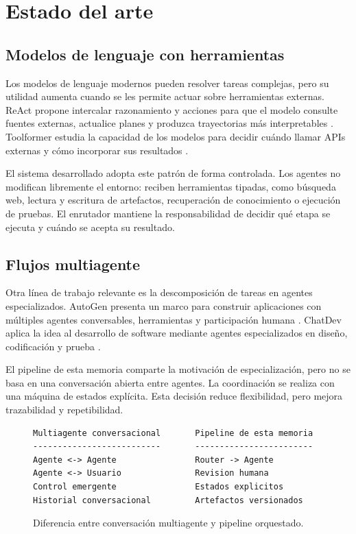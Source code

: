\chapter{Estado del arte}

\section{Modelos de lenguaje con herramientas}

Los modelos de lenguaje modernos pueden resolver tareas complejas, pero su
utilidad aumenta cuando se les permite actuar sobre herramientas externas.
ReAct propone intercalar razonamiento y acciones para que el modelo consulte
fuentes externas, actualice planes y produzca trayectorias más interpretables
\cite{yao2023react}. Toolformer estudia la capacidad de los modelos para decidir
cuándo llamar APIs externas y cómo incorporar sus resultados \cite{schick2023toolformer}.

El sistema desarrollado adopta este patrón de forma controlada. Los agentes no
modifican libremente el entorno: reciben herramientas tipadas, como búsqueda web,
lectura y escritura de artefactos, recuperación de conocimiento o ejecución de
pruebas. El enrutador mantiene la responsabilidad de decidir qué etapa se
ejecuta y cuándo se acepta su resultado.

\section{Flujos multiagente}

Otra línea de trabajo relevante es la descomposición de tareas en agentes
especializados. AutoGen presenta un marco para construir aplicaciones con
múltiples agentes conversables, herramientas y participación humana
\cite{wu2023autogen}. ChatDev aplica la idea al desarrollo de software mediante
agentes especializados en diseño, codificación y prueba \cite{qian2024chatdev}.

El pipeline de esta memoria comparte la motivación de especialización, pero no
se basa en una conversación abierta entre agentes. La coordinación se realiza con
una máquina de estados explícita. Esta decisión reduce flexibilidad, pero mejora
trazabilidad y repetibilidad.

\begin{figure}[H]
\centering
\begin{verbatim}
Multiagente conversacional       Pipeline de esta memoria
--------------------------       ------------------------
Agente <-> Agente                Router -> Agente
Agente <-> Usuario               Revision humana
Control emergente                Estados explicitos
Historial conversacional         Artefactos versionados
\end{verbatim}
\caption{Diferencia entre conversación multiagente y pipeline orquestado.}
\end{figure}

